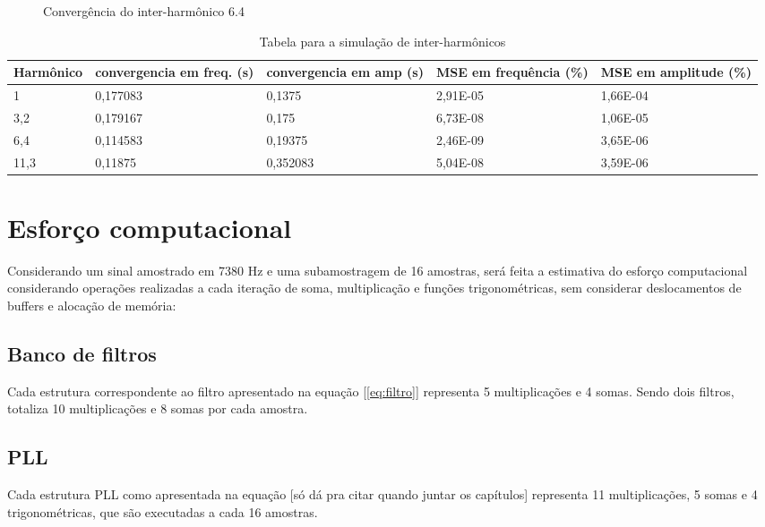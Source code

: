 \begin{figure}[H]
	\centering    
	\def\svgscale{1}
	
	\caption{Convergência do inter-harmônico 6.4}
	\label{fig:esquema_pll}
\end{figure}

\begin{table}[H]
	\centering
	\begin{tabular}{|p{2.5cm}|p{2.5cm}|p{2.5cm}|p{2.5cm}|p{2.5cm}|}
		\hline
		Harmônico & convergencia em freq. (s)& convergencia em amp (s) & MSE em frequência (\%) & MSE em amplitude (\%)\\
		\hline
		1    & 0,177083 & 0,1375   & 2,91E-05 & 1,66E-04 \\
		3,2  & 0,179167 & 0,175    & 6,73E-08 & 1,06E-05 \\
		6,4  & 0,114583 & 0,19375  & 2,46E-09 & 3,65E-06 \\
		11,3 & 0,11875  & 0,352083 & 5,04E-08 & 3,59E-06 \\
		\hline
	\end{tabular}
	\caption{Tabela para a simulação de inter-harmônicos}
\end{table}


\section{Esforço computacional}

\indent Considerando um sinal amostrado em 7380  Hz e uma subamostragem de 16 amostras, será feita a estimativa do esforço computacional considerando operações realizadas a cada iteração de soma, multiplicação e funções trigonométricas, sem considerar deslocamentos de buffers e alocação de memória:

\subsection{Banco de filtros}

\indent Cada estrutura correspondente ao filtro apresentado na equação [\ref{eq:filtro}] representa 5 multiplicações e 4 somas. Sendo dois filtros, totaliza 10 multiplicações e 8 somas por cada amostra.

\subsection{PLL}

\indent Cada estrutura PLL como apresentada na equação [só dá pra citar quando juntar os capítulos] representa 11 multiplicações, 5 somas e 4 trigonométricas, que são executadas a cada 16 amostras. 

